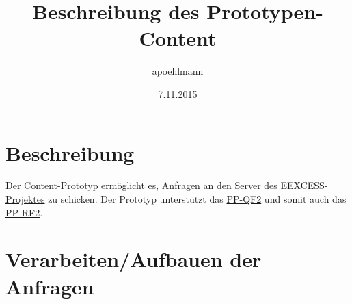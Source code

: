 \documentclass[a4paper,10pt]{article}
\title{Beschreibung des Prototypen-Content}
\author{apoehlmann}
\date{7.11.2015}
\begin{document}
\maketitle
\tableofcontents
\pagebreak

\section{Beschreibung}
Der Content-Prototyp ermöglicht es, Anfragen an den Server des  
\href{https://github.com/EEXCESS/eexcess/wiki}{EEXCESS-Projektes} zu schicken.
Der Prototyp unterstützt das \href{https://github.com/EEXCESS/eexcess/wiki/%5B21.09.2015%5D-Request-and-Response-format#pp-query-format}{PP-QF2}
und somit auch das \href{https://github.com/EEXCESS/eexcess/wiki/%5B21.09.2015%5D-Request-and-Response-format#pp-response-format}{PP-RF2}.

\section{Verarbeiten/Aufbauen der Anfragen}
\end{document}
